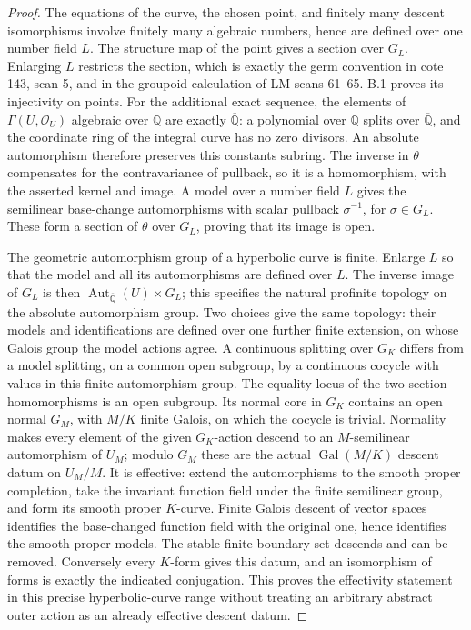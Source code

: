 \documentclass[11pt,oneside]{article}
\begin{document}
\begin{proof}
The equations of the curve, the chosen point, and finitely many
descent isomorphisms involve finitely many algebraic numbers, hence
are defined over one number field $L$.  The structure map of the
point gives a section over $G_L$.  Enlarging $L$ restricts the
section, which is exactly the germ convention in cote 143, scan 5,
and in the groupoid calculation of LM scans 61--65.
B.1 proves its injectivity on points.
For the additional exact sequence, the elements of
$\Gamma(U,\mathcal O_U)$ algebraic over $\mathbb Q$ are exactly
$\overline{\mathbb Q}$: a polynomial over $\mathbb Q$ splits
over $\overline{\mathbb Q}$, and the coordinate ring of the
integral curve has no zero divisors. An absolute automorphism
therefore preserves this constants subring. The inverse in
$\theta$ compensates for the contravariance of pullback, so
it is a homomorphism, with the asserted kernel and image.
A model over a number field $L$ gives the semilinear
base-change automorphisms with scalar pullback $\sigma^{-1}$,
for $\sigma\in G_L$. These form a section of $\theta$ over
$G_L$, proving that its image is open.

The geometric automorphism group of a hyperbolic curve is
finite. Enlarge $L$ so that the model and all its automorphisms
are defined over $L$. The inverse image of $G_L$ is then
$\operatorname{Aut}_{\overline{\mathbb Q}}(U)\times G_L$;
this specifies the natural profinite topology on the
absolute automorphism group. Two choices give the same topology:
their models and identifications are defined over one further
finite extension, on whose Galois group the model actions agree.
A continuous splitting over
$G_K$ differs from a model splitting, on a common open
subgroup, by a continuous cocycle with values in this finite
automorphism group. The equality locus of the two section
homomorphisms is an open subgroup. Its normal core in $G_K$
contains an open normal $G_M$, with $M/K$ finite Galois,
on which the cocycle is trivial. Normality makes every element
of the given $G_K$-action descend to an $M$-semilinear
automorphism of $U_M$; modulo $G_M$ these are the actual
$\operatorname{Gal}(M/K)$ descent datum on $U_M/M$.
It is effective: extend the automorphisms to the smooth
proper completion, take the invariant function field under
the finite semilinear group, and form its smooth proper
$K$-curve. Finite Galois descent of vector spaces identifies
the base-changed function field with the original one, hence
identifies the smooth proper models. The stable finite
boundary set descends and can be removed. Conversely every
$K$-form gives this datum, and an isomorphism of forms is
exactly the indicated conjugation. This proves the
effectivity statement in this precise hyperbolic-curve
range without treating an arbitrary abstract outer action
as an already effective descent datum.


\end{proof}
\end{document}
